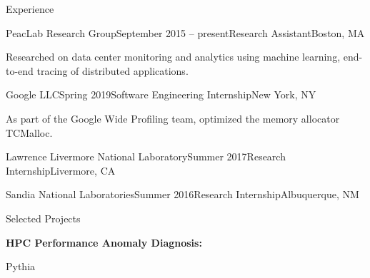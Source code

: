 \documentclass{resume}
\begin{document}
\begin{rSection}{Experience}

\begin{rSubsection}{PeacLab Research Group}{September 2015 -- present}{Research
    Assistant}{Boston, MA}
\item Researched on data center monitoring and analytics using machine learning,
  end-to-end tracing of distributed applications.
\end{rSubsection}

\begin{rSubsection}{Google LLC}{Spring 2019}{Software Engineering
    Internship}{New York, NY}
\item As part of the Google Wide Profiling team, optimized the memory allocator
  TCMalloc.
\end{rSubsection}

\begin{rSubsection}{Lawrence Livermore National Laboratory}{Summer
    2017}{Research Internship}{Livermore, CA}
\end{rSubsection}

\begin{rSubsection}{Sandia National Laboratories}{Summer 2016}{Research
    Internship}{Albuquerque, NM}
\end{rSubsection}

\end{rSection}



\begin{rSection}{Selected Projects} \itemsep -2pt
\item {\bf HPC Performance Anomaly Diagnosis:}
\item Pythia
\end{rSection}

\end{document}
